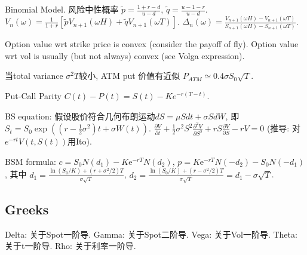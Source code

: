 \documentclass[UTF8]{ctexart}
\begin{document}
Binomial Model.
风险中性概率 $\widetilde{p} = \frac{1+r-d}{u-d}$, $\widetilde{q} = \frac{u-1-r}{u-d}$.
$V_n(\omega)=\frac{1}{1+r}[\widetilde{p}V_{n+1}(\omega H) + \widetilde{q}V_{n+1}(\omega T)]$.
$\Delta_n(\omega) = \frac{V_{n+1}(\omega H)-V_{n+1}(\omega T)}{S_{n+1}(\omega H)-S_{n+1}(\omega T)}$.


Option value wrt strike price is convex (consider the payoff of fly).
Option value wrt vol is usually (but not always) convex (see Volga expression).

当total variance $\sigma^2 T$较小, ATM put 价值有近似 $P_{ATM}\simeq 0.4\sigma S_0\sqrt{T}$.

Put-Call Parity $C(t)-P(t) = S(t) - Ke^{-r(T-t)}$.

BS equation: 假设股价符合几何布朗运动$dS=\mu S d t+\sigma S dW$, 即$S_t = S_0 \exp ((r-\frac{1}{2}\sigma^2)t+\sigma W(t))$.
$\frac{\partial V}{\partial t}+\frac{1}{2} \sigma^{2} S^{2} \frac{\partial^{2} V}{\partial S^{2}}+r S \frac{\partial V}{\partial S}-r V=0$
(推导: 对$e^{-rt}V(t,S(t))$用Ito).

BSM formula:
$c=S_0 N\left(d_1\right)-K \mathrm{e}^{-r T} N\left(d_2\right) $,
$p=K \mathrm{e}^{-r T} N\left(-d_2\right)-S_0 N\left(-d_1\right) $, 其中
$d_1=\frac{\ln \left(S_0 / K\right)+\left(r+\sigma^2 / 2\right) T}{\sigma \sqrt{T}} $,
$d_2=\frac{\ln \left(S_0 / K\right)+\left(r-\sigma^2 / 2\right) T}{\sigma \sqrt{T}}=d_1-\sigma \sqrt{T}$.


\subsection{Greeks}
Delta: 关于Spot一阶导.
Gamma: 关于Spot二阶导.
Vega: 关于Vol一阶导.
Theta: 关于t一阶导.
Rho: 关于利率一阶导.
\end{document}
